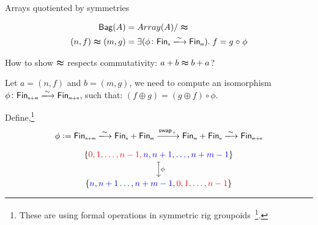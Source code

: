 \documentclass[9pt]{beamer}
\begin{document}
\begin{frame}[fragile]{Arrays quotiented by symmetries}
    \begin{dblock}
        \vspace{-0.4cm}
        \begin{align*}
            \type{Bag}(A) &= Array(A) / \reln
            \\
            (n,f) \reln (m,g) &= 
                \exis{\phi\colon \Fin[n]\xto{\sim}\Fin[m]}{f = g \comp \phi}
        \end{align*}
    \end{dblock}
    How to show $\mathrel{\boldsymbol{\approx}}$ respects \alert{commutativity}: $a + b \mathrel{\boldsymbol{\approx}} b + a$?

    Let $a = (n , f)$ and $b = (m , g)$, we need to compute an isomorphism $\phi\colon \Fin[n+m]\xto{\sim}\Fin[m+n]$,
    such that: $(f \oplus g) = (g \oplus f) \circ \phi$.

    Define,\footnote{These are using formal operations in symmetric rig groupoids~\footcite{choudhurySymmetriesReversibleProgramming2022}.}
    \begin{align*}
        \phi := \Fin[n+m] \xto{\sim} \Fin[n] + \Fin[m] \xto{\term{swap}_{+}} \Fin[m] + \Fin[n] \xto{\sim} \Fin[m+n] \\
    \end{align*}

        \vspace{-0.6cm}

\[\begin{tikzcd}[ampersand replacement=\&,cramped]
	{\{\color{red}0,1,\dots,n-1, \color{blue} n,n+1,\dots,n+m-1 \color{black}\}} \\
	{ \{\color{blue}n,n+1\dots,n+m-1, \color{red}0,1,\dots,n-1 \color{black}\}}
    \arrow["\phi", maps to, from=1-1, to=2-1]
\end{tikzcd}\]
    
\end{frame}
\end{document}

